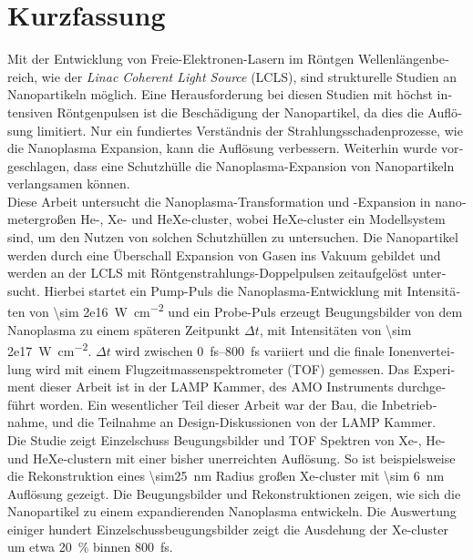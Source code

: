 \section*{Kurzfassung}
\begin{otherlanguage}{german}
Mit der Entwicklung von Freie-Elektronen-Lasern im Röntgen Wellenlängenbereich, wie der \textit{Linac Coherent Light Source} (LCLS), sind strukturelle Studien an Nanopartikeln möglich. Eine Herausforderung bei diesen Studien mit höchst intensiven Röntgenpulsen ist die Beschädigung der Nanopartikel, da dies die Auflösung limitiert. Nur ein fundiertes Verständnis der Strahlungsschadenprozesse, wie die Nanoplasma Expansion, kann die Auflösung verbessern. Weiterhin wurde vorgeschlagen, dass eine Schutzhülle die Nanoplasma-Expansion von Nanopartikeln verlangsamen können.\\[0.6\baselineskip]
%
Diese Arbeit untersucht die Nanoplasma-Transformation und -Expansion in nanometergroßen He-, Xe- und HeXe-cluster, wobei HeXe-cluster ein Modellsystem sind, um den Nutzen von solchen Schutzhüllen zu untersuchen. Die Nanopartikel werden durch eine Überschall Expansion von Gasen ins Vakuum gebildet und werden an der LCLS mit Röntgenstrahlungs-Doppelpulsen zeitaufgelöst untersucht. Hierbei startet ein Pump-Puls die Nanoplasma-Entwicklung mit Intensitäten von \SI{\sim 2e16}{\watt\per\square\centi\meter} und ein Probe-Puls erzeugt Beugungsbilder von dem Nanoplasma zu einem späteren Zeitpunkt $\Delta t$, mit Intensitäten von \SI{\sim 2e17}{\watt\per\square\centi\meter}. $\Delta t$ wird zwischen \SIrange{0}{800}{\femto\second} variiert und die finale Ionenverteilung wird mit einem Flugzeitmassenspektrometer (TOF) gemessen. Das Experiment dieser Arbeit ist in der LAMP Kammer, des AMO Instruments durchgeführt worden. Ein wesentlicher Teil dieser Arbeit war der Bau, die Inbetriebnahme, und die Teilnahme an Design-Diskussionen von der LAMP Kammer.\\[0.6\baselineskip]
%
Die Studie zeigt Einzelschuss Beugungsbilder und TOF Spektren von Xe-, He- und HeXe-clustern mit einer bisher unerreichten Auflösung. So ist beispielsweise die Rekonstruktion eines \SI{\sim25}{\nano\meter} Radius großen Xe-cluster mit \SI{\sim 6}{\nano\meter} Auflösung gezeigt. Die Beugungsbilder und Rekonstruktionen zeigen, wie sich die Nanopartikel zu einem expandierenden Nanoplasma entwickeln. Die Auswertung einiger hundert Einzelschussbeugungsbilder zeigt die Ausdehung der Xe-cluster um etwa \SI{20}{\percent} binnen \SI{800}{\femto\second}. 

\end{otherlanguage}
